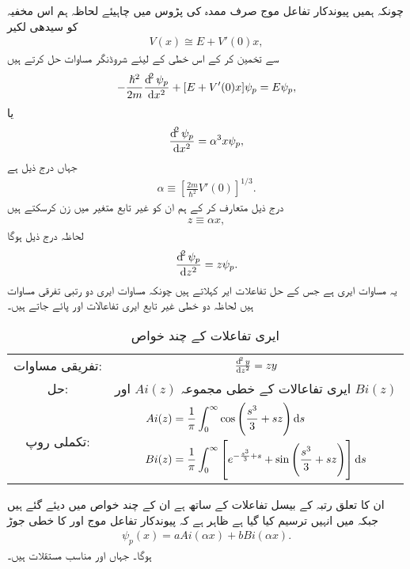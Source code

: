 چونکہ ہمیں پیوندکار تفاعل موج  صرف ممدہ کی پڑوس میں چاہیئے لحاظہ ہم اس مخفیہ کو سیدھی لکیر 
\begin{align}
	V(x) \cong E + V'(0)x,
\end{align}
سے تخمین کر کے اس خطی  کے لیئے شروڈنگر مساوات حل کرتے ہیں
\begin{align*}
	-\frac{\hslash^{2}}{2m} \frac{\dif^{2}\psi_{p}}{\dif x^{2}} +[E+V'(0)x]\psi_{p}=E\psi_{p},
\end{align*}
یا 
\begin{align}
	\frac{\dif^{2} \psi_{p}}{\dif x^{2}} = \alpha^{3} x\psi_{p},
\end{align}
جہاں درج ذیل ہے
\begin{align}
	\alpha\equiv\left[\frac{2m}{\hslash^{2}} V'(0)\right]^{1/3}.
\end{align}
درج ذیل متعارف کر کے ہم ان  کو غیر تابع متغیر میں زن کرسکتے ہیں
\begin{align}
	z\equiv\alpha x,
\end{align}
لحاظہ درج ذیل ہوگا
\begin{align}
	\frac{\dif^{2}\psi_{p}}{\dif z^{2}}=z\psi_{p}.
\end{align}
یہ مساوات ایری ہے جس کے حل تفاعلات ایر کہلاتے ہیں چونکہ مساوات ایری دو رتبی تفرقی مساوات ہیں لحاظہ دو خطی غیر تابع ایری تفاعالات  اور  پائے جاتے ہیں۔
\begin{table}[h!]
\centering
\caption{ایری تفاعلات کے چند خواص}
\label{table:1}
\begin{tabular}{|c c|}
\hline
تفریقی مساوات: & $\frac{\dif^2y}{\dif z^2}=zy$\\
حل: & ایری تفاعالات کے خطی مجموعہ $Ai(z)$ اور $Bi(z)$ \\
تکملی روپ: & 
{$\begin{aligned}
Ai(z)&=\frac{1}{\pi}\int_{0}^{\infty}\cos\left(\frac{s^3}{3}+sz\right)\dif s \\
Bi(z)&=\frac{1}{\pi}\int_{0}^{\infty}\left[e^{-\frac{s^3}{3}+s}+\sin\left(\frac{s^3}{3}+sz\right)\right]\dif s
\end{aligned}$}\\
\hline
\end{tabular}
\end{table}
ان کا تعلق رتبہ  کے بیسل تفاعلات کے ساتھ ہے ان کے چند خواص  میں دیئے گئے ہیں جبکہ  میں انہیں ترسیم کیا گیا ہے ظاہر ہے کہ پیوندکار تفاعل موج  اور  کا خطی جوڑ 
\begin{align}
	\psi_{p}(x) = aAi(\alpha x)+ bBi(\alpha x).
\end{align}
ہوگا۔ جہاں  اور  مناسب مستقلات ہیں۔

